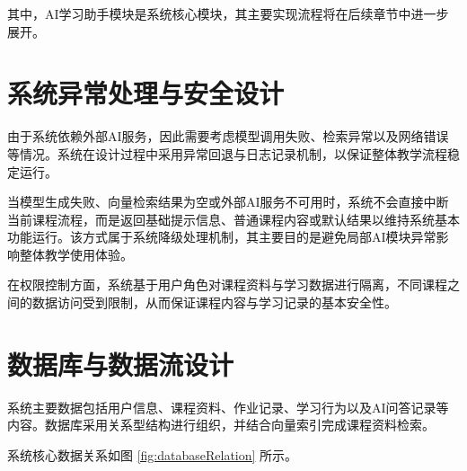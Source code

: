 \documentclass[12pt,a4paper,oneside]{ctexbook}
\numberwithin{equation}{chapter}
\begin{document}
其中，AI学习助手模块是系统核心模块，其主要实现流程将在后续章节中进一步展开。

\section{系统异常处理与安全设计}

由于系统依赖外部AI服务，因此需要考虑模型调用失败、检索异常以及网络错误等情况。系统在设计过程中采用异常回退与日志记录机制，以保证整体教学流程稳定运行。

当模型生成失败、向量检索结果为空或外部AI服务不可用时，系统不会直接中断当前课程流程，而是返回基础提示信息、普通课程内容或默认结果以维持系统基本功能运行。该方式属于系统降级处理机制，其主要目的是避免局部AI模块异常影响整体教学使用体验。

在权限控制方面，系统基于用户角色对课程资料与学习数据进行隔离，不同课程之间的数据访问受到限制，从而保证课程内容与学习记录的基本安全性。

\section{数据库与数据流设计}

系统主要数据包括用户信息、课程资料、作业记录、学习行为以及AI问答记录等内容。数据库采用关系型结构进行组织，并结合向量索引完成课程资料检索。

系统核心数据关系如图 \ref{fig:databaseRelation} 所示。
\end{document}

